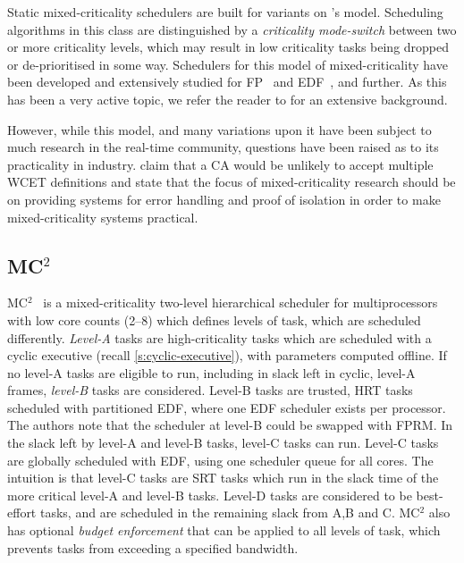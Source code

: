 Static mixed-criticality schedulers are built for variants on \citet{Vestal_07}'s model.
Scheduling algorithms in this class are distinguished by a \emph{criticality mode-switch}
between two or more criticality levels,
which may result in low criticality tasks being dropped or de-prioritised in some way. 
Schedulers for this model of mixed-criticality have been developed and extensively studied for
\gls{FP}~\citep{Vestal_07, Pathan:phd} and \gls{EDF}~\citep{Baruah_BDMVS_11}, and further. 
 As this has been a very active topic, we refer the reader to \citet{Burns_Davis_17} for
an extensive background. 

However, while this model, and many variations upon it have been subject to much research
in the real-time community, questions have been raised as to its practicality in industry.
\citet{Ernst_DiNatale_16} claim that a \gls{CA} would be unlikely to accept multiple \gls{WCET}
definitions and state that the focus of mixed-criticality research should be on
providing systems for error handling and proof of isolation in order to make mixed-criticality
systems practical.

\subsection{MC$^2$}
\label{sec:sched-mc2}

MC$^2$~\citep{Herman_KMAJ_12} is a mixed-criticality two-level hierarchical scheduler 
for multiprocessors with low core counts (2--8) which defines levels of task, which are scheduled differently.
\emph{Level-A} tasks are high-criticality tasks which are scheduled with a cyclic executive (recall
\cref{s:cyclic-executive}), with parameters computed offline. If no level-A tasks are eligible to
run, including in slack left in cyclic, level-A frames, \emph{level-B} tasks are considered. Level-B
tasks are trusted, \gls{HRT} tasks scheduled with partitioned \gls{EDF}, where one \gls{EDF}
scheduler exists per processor.
The authors note that the scheduler at level-B could be swapped with \gls{FPRM}.
In the slack left by level-A and level-B tasks, level-C tasks can run. Level-C tasks are globally
scheduled with \gls{EDF}, using one scheduler queue for all cores. The intuition is that level-C
tasks are \gls{SRT} tasks which run in the slack time of the more critical level-A and level-B
tasks. Level-D tasks are considered to be best-effort tasks, and are scheduled in the remaining
slack from A,B and C. MC$^2$ also has optional \emph{budget enforcement} that can be applied to all
levels of task, which prevents tasks from exceeding a specified bandwidth. 


